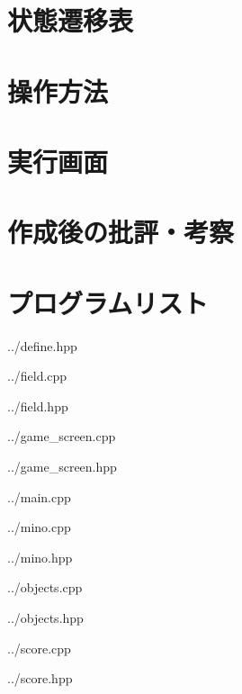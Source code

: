 \documentclass[11pt,a4paper,dvipdfmx]{jsarticle}
\begin{document}
  \section{状態遷移表}
    
  \section{操作方法}
    
  \clearpage
  \section{実行画面}
    
  \clearpage
  \section{作成後の批評・考察}
    
  \clearpage
  \section{プログラムリスト}
    
    {../define.hpp}
  \clearpage
    
    {../field.cpp}
  \clearpage
    
    {../field.hpp}
  \clearpage
    
    {../game_screen.cpp}
  \clearpage
    
    {../game_screen.hpp}
  \clearpage
    
    {../main.cpp}
  \clearpage
    
    {../mino.cpp}
  \clearpage
    
    {../mino.hpp}
  \clearpage
    
    {../objects.cpp}
  \clearpage
    
    {../objects.hpp}
  \clearpage
    
    {../score.cpp}
  \clearpage
    
    {../score.hpp}
  \clearpage
\end{document}

